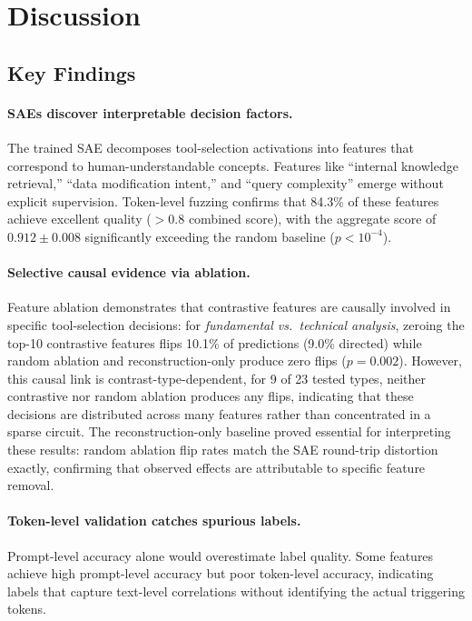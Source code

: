 \documentclass[runningheads]{llncs}
\begin{document}
\section{Discussion}
\label{sec:discussion}

\subsection{Key Findings}

\paragraph{SAEs discover interpretable decision factors.} The trained SAE decomposes tool-selection activations into features that correspond to human-understandable concepts. Features like ``internal knowledge retrieval,'' ``data modification intent,'' and ``query complexity'' emerge without explicit supervision. Token-level fuzzing confirms that 84.3\% of these features achieve excellent quality ($> 0.8$ combined score), with the aggregate score of $0.912 \pm 0.008$ significantly exceeding the random baseline ($p < 10^{-4}$).

\paragraph{Selective causal evidence via ablation.} Feature ablation demonstrates that contrastive features are causally involved in specific tool-selection decisions: for \emph{fundamental vs.\ technical analysis}, zeroing the top-10 contrastive features flips 10.1\% of predictions (9.0\% directed) while random ablation and reconstruction-only produce zero flips ($p = 0.002$). However, this causal link is contrast-type-dependent, for 9 of 23 tested types, neither contrastive nor random ablation produces any flips, indicating that these decisions are distributed across many features rather than concentrated in a sparse circuit. The reconstruction-only baseline proved essential for interpreting these results: random ablation flip rates match the SAE round-trip distortion exactly, confirming that observed effects are attributable to specific feature removal.

\paragraph{Token-level validation catches spurious labels.} Prompt-level accuracy alone would overestimate label quality. Some features achieve high prompt-level accuracy but poor token-level accuracy, indicating labels that capture text-level correlations without identifying the actual triggering tokens.
\end{document}
